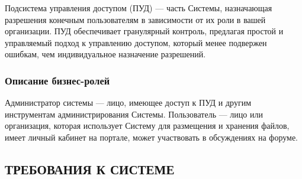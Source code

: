 \documentclass[a4paper,14pt]{extarticle}
\begin{document}
Подсистема управления доступом (ПУД) --- часть Системы, назначающая разрешения конечным пользователям в зависимости от их роли в вашей организации. ПУД обеспечивает гранулярный контроль, предлагая простой и управляемый подход к управлению доступом, который менее подвержен ошибкам, чем индивидуальное назначение разрешений.

\subsubsection{Описание бизнес-ролей}
Администратор системы --- лицо, имеющее доступ к ПУД и другим инструментам администрирования Системы.
Пользователь --- лицо или организация, которая использует Систему для размещения и хранения файлов, имеет личный кабинет на портале, может участвовать в обсуждениях на форуме.

\subsection{ТРЕБОВАНИЯ К СИСТЕМЕ}
\end{document}
